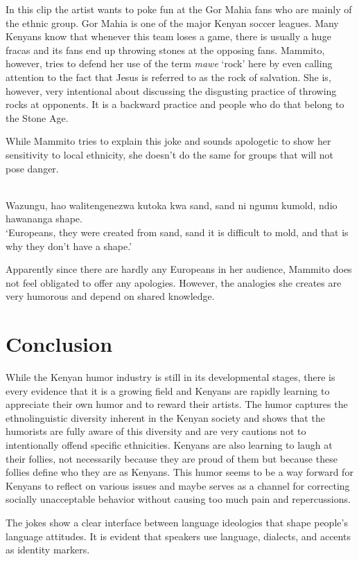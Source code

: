 \documentclass[output=paper]{langsci/langscibook}
\begin{document}
In this clip the artist wants to poke fun at the Gor Mahia fans who are mainly of the  ethnic group. Gor Mahia is one of the major Kenyan soccer leagues. Many Kenyans know that whenever this team loses a game, there is usually a huge fracas and its fans end up throwing stones at the opposing fans. Mammito, however, tries to defend her use of the term \textit{mawe }‘rock’ here by even calling attention to the fact that Jesus is referred to as the rock of salvation. She is, however, very intentional about discussing the disgusting practice of throwing rocks at opponents. It is a backward practice and people who do that belong to the Stone Age.

While Mammito tries to explain this joke and sounds apologetic to show her sensitivity to local ethnicity, she doesn’t do the same for groups that will not pose danger. 
 
\\
\smallskip
 Wazungu, hao walitengenezwa kutoka kwa sand, sand ni ngumu kumold, ndio hawananga shape. \\
\glt ‘Europeans, they were created from sand, sand it is difficult to mold, and that is why they don’t have a shape.’ \citep{ChurchillRaw2014}
\z

Apparently since there are hardly any Europeans in her audience, Mammito does not feel obligated to offer any apologies. However, the analogies she creates are very humorous and depend on shared knowledge. 

\section{Conclusion}

While the Kenyan humor industry is still in its developmental stages, there is every evidence that it is a growing field and Kenyans are rapidly learning to appreciate their own humor and to reward their artists. The humor captures the ethnolinguistic diversity inherent in the Kenyan society and shows that the humorists are fully aware of this diversity and are very cautions not to intentionally offend specific ethnicities. Kenyans are also learning to laugh at their follies, not necessarily because they are proud of them but because these follies define who they are as Kenyans. This humor seems to be a way forward for Kenyans to reflect on various issues and maybe serves as a channel for correcting socially unacceptable behavior without causing too much pain and repercussions.

The jokes show a clear interface between language ideologies that shape people’s language attitudes. It is evident that speakers use language, dialects, and accents as identity markers. \\


{\sloppy
\printbibliography[heading=subbibliography,notkeyword=this]
}
\end{document}
